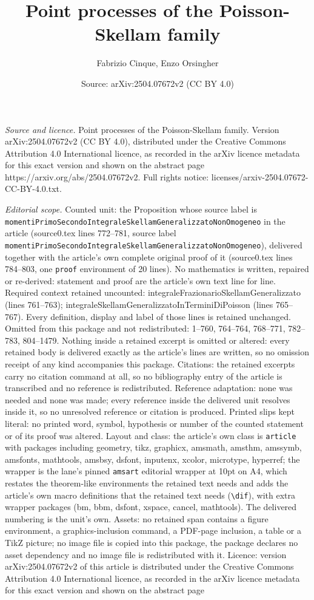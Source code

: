 \documentclass[10pt,a4paper]{amsart}
\title[Point processes of the Poisson-Skellam family]{Point processes of the Poisson-Skellam family}
\author{Fabrizio Cinque, Enzo Orsingher}
\date{Source: arXiv:2504.07672v2 (CC BY 4.0)}
\begin{document}
\maketitle

\noindent\emph{Source and licence.} Point processes of the Poisson-Skellam family. Version arXiv:2504.07672v2 (CC BY 4.0), distributed under the Creative Commons Attribution 4.0 International licence, as recorded in the arXiv licence metadata for this exact version and shown on the abstract page https://arxiv.org/abs/2504.07672v2. Full rights notice: licenses/arxiv-2504.07672-CC-BY-4.0.txt.\par\smallskip

\noindent\textit{Editorial scope.} Counted unit: the Proposition whose source label is \texttt{momentiPrimoSecondoIntegraleSkellamGeneralizzatoNonOmogeneo} in the article (source0.tex lines 772--781, source label \texttt{momentiPrimoSecondoIntegraleSkellamGeneralizzatoNonOmogeneo}), delivered together with the article's own complete original proof of it (source0.tex lines 784--803, one \texttt{proof} environment of 20 lines). No mathematics is written, repaired or re-derived: statement and proof are the article's own text line for line. Required context retained uncounted: integraleFrazionarioSkellamGeneralizzato (lines 761--763); integraleSkellamGeneralizzatoInTerminiDiPoisson (lines 765--767). Every definition, display and label of those lines is retained unchanged. Omitted from this package and not redistributed: 1--760, 764--764, 768--771, 782--783, 804--1479. Nothing inside a retained excerpt is omitted or altered: every retained body is delivered exactly as the article's lines are written, so no omission receipt of any kind accompanies this package. Citations: the retained excerpts carry no citation command at all, so no bibliography entry of the article is transcribed and no reference is redistributed. Reference adaptation: none was needed and none was made; every reference inside the delivered unit resolves inside it, so no unresolved reference or citation is produced. Printed slips kept literal: no printed word, symbol, hypothesis or number of the counted statement or of its proof was altered. Layout and class: the article's own class is \texttt{article} with packages including geometry, tikz, graphicx, amsmath, amsthm, amssymb, amsfonts, mathtools, amsbsy, dsfont, inputenx, xcolor, microtype, hyperref; the wrapper is the lane's pinned \texttt{amsart} editorial wrapper at 10pt on A4, which restates the theorem-like environments the retained text needs and adds the article's own macro definitions that the retained text needs (\texttt{\textbackslash dif}), with extra wrapper packages (bm, bbm, dsfont, xspace, cancel, mathtools). The delivered numbering is the unit's own. Assets: no retained span contains a figure environment, a graphics-inclusion command, a PDF-page inclusion, a table or a TikZ picture; no image file is copied into this package, the package declares no asset dependency and no image file is redistributed with it. Licence: version arXiv:2504.07672v2 of this article is distributed under the Creative Commons Attribution 4.0 International licence, as recorded in the arXiv licence metadata for this exact version and shown on the abstract page 
\end{document}

